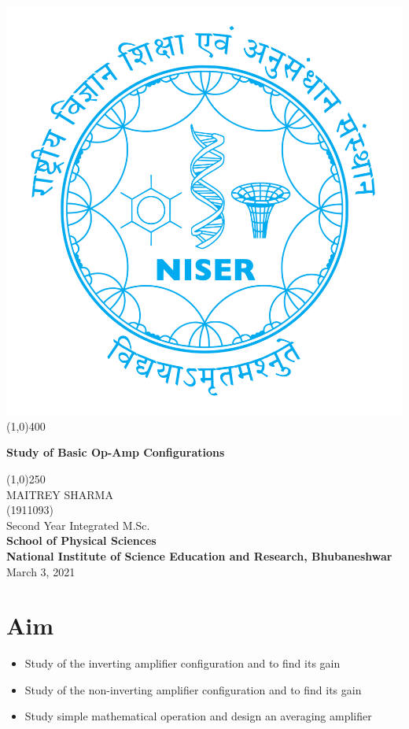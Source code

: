 \begin{titlepage}
\begin{center}
\includegraphics[scale=0.15]{OPAMP Config/niser.png}
\line(1,0){400}\\
[2mm]
\begin{large}
\textbf{\huge Study of Basic Op-Amp Configurations}\\ 
\end{large}
\line(1,0){250}\\
[5cm]
\large MAITREY SHARMA\\
\small (1911093)\\
[4.5cm]
Second Year Integrated M.Sc.\\
\textbf{School of Physical Sciences}\\
\textbf{National Institute of Science Education and Research, Bhubaneshwar}\\
\small March 3, 2021
\end{center} 
\end{titlepage}
\newpage
\section{Aim}
\begin{itemize}
    \item Study of the inverting amplifier configuration and to find its gain
    \item Study of the non-inverting amplifier configuration and to find its gain
    \item Study simple mathematical operation and design an averaging amplifier
\end{itemize}
